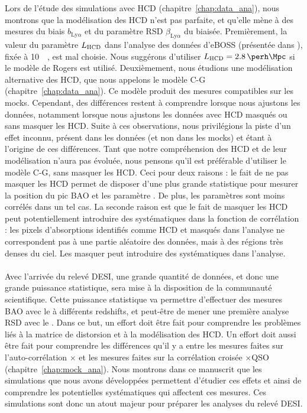 Lors de l'étude des simulations avec HCD (chapitre~\ref{chap:data_ana}), nous montrons que la modélisation des HCD n'est pas parfaite, et qu'elle mène à des mesures du biais $b_{\mathrm{Ly}\alpha}$ et du paramètre RSD $\beta_{\mathrm{Ly}\alpha}$ du \lya{} biaisée.
Premièrement, la valeur du paramètre $L_{\textsc{HCD}}$ dans l'analyse des données d'eBOSS (présentée dans \textcite{DuMasdesBourboux2020}), fixée à \SI{10}{\perh\Mpc}, est mal choisie. Nous suggérons d'utiliser $L_{\textsc{HCD}} = \SI{2.8}{\perh\Mpc}$ si le modèle de Rogers est utilisé.
Deuxièmement, nous étudions une modélisation alternative des HCD, que nous appelons le modèle C-G (chapitre~\ref{chap:data_ana}). Ce modèle produit des mesures compatibles sur les mocks. Cependant, des différences restent à comprendre lorsque nous ajustons les données, notamment lorsque nous ajustons les données avec HCD masqués ou sans masquer les HCD. Suite à ces observations, nous privilégions la piste d'un effet inconnu, présent dans les données (et non dans les mocks) et étant à l'origine de ces différences.
Tant que notre compréhension des HCD et de leur modélisation n'aura pas évoluée, nous pensons qu'il est préférable d'utiliser le modèle C-G, sans masquer les HCD. Ceci pour deux raisons : le fait de ne pas masquer les HCD permet de disposer d'une plus grande statistique pour mesurer la position du pic BAO et les paramètre \lya{}. De plus, les paramètres \lya{} sont moins corrélés dans un tel cas. La seconde raison est que le fait de masquer les HCD peut potentiellement introduire des systématiques dans la fonction de corrélation : les pixels d'absorptions identifiés comme HCD et masqués dans l'analyse ne correspondent pas à une partie aléatoire des données, mais à des régions très denses du ciel. Les masquer peut introduire des systématiques dans l'analyse.


\paragraph{}
Avec l'arrivée du relevé DESI, une grande quantité de données, et donc une grande puissance statistique, sera mise à la disposition de la communauté scientifique. Cette puissance statistique va permettre d'effectuer des mesures BAO avec le \lya{} à différents redshifts, et peut-être de mener une première analyse RSD avec le \lya{}. Dans ce but, un effort doit être fait pour comprendre les problèmes liés à la matrice de distorsion et à la modélisation des HCD. Un effort doit aussi être fait pour comprendre les différences qu'il y a entre les mesures faites sur l'auto-corrélation \lya{}$\times$\lya{} et les mesures faites sur la corrélation croisée \lya{}$\times$QSO (chapitre~\ref{chap:mock_ana}).
Nous montrons dans ce manuscrit que les simulations que nous avons développées permettent d'étudier ces effets et ainsi de comprendre les potentielles systématiques qui affectent ces mesures. Ces simulations sont donc un atout majeur pour préparer les analyses \lya{} du relevé DESI.


% 
